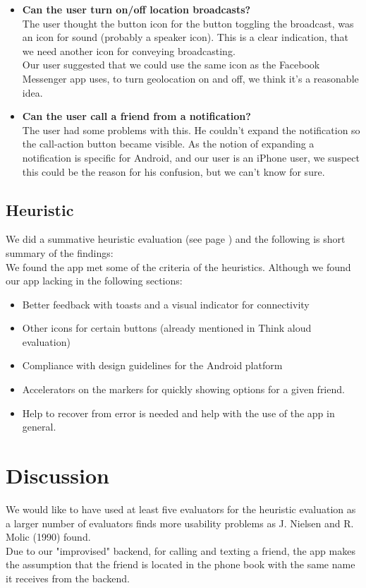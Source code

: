 \documentclass[runningheads,a4paper]{llncs}
\begin{document}
\begin{itemize}
\item \textbf{Can the user turn on/off location broadcasts?}\\
	The user thought the button icon for the button toggling the broadcast, was an icon for sound (probably a speaker icon). This is a clear indication, that we need another icon for conveying broadcasting. \\
	Our user suggested that we could use the same icon as the Facebook Messenger app uses, to turn geolocation on and off, we think it's a reasonable idea. 
\item \textbf{Can the user call a friend from a notification?}\\
	The user had some problems with this. He couldn't expand the notification so the call-action button became visible. 
As the notion of expanding a notification is specific for Android, and our user is an iPhone user, we suspect this could be the reason for his confusion, but we can't know for sure.
\end{itemize}

\subsection*{Heuristic}
We did a summative heuristic evaluation (see page \pageref{heuristic}) and the following is short summary of the findings: \\

We found the app met some of the criteria of the heuristics. Although we found our app lacking in the following sections:
\begin{itemize}
\item Better feedback with toasts and a visual indicator for connectivity
\item Other icons for certain buttons (already mentioned in Think aloud evaluation)
\item Compliance with design guidelines for the Android platform
\item Accelerators on the markers for quickly showing options for a given friend.
\item Help to recover from error is needed and help with the use of the app in general.
\end{itemize}
\section{Discussion}
We would like to have used at least five evaluators for the heuristic evaluation as a larger number of evaluators finds more usability problems as J. Nielsen and R. Molic (1990) found.\cite{heuristics}\\
Due to our "improvised" backend, for calling and texting a friend, the app makes the assumption that the friend is located in the phone book with the same name it receives from the backend.\\
\end{document}
